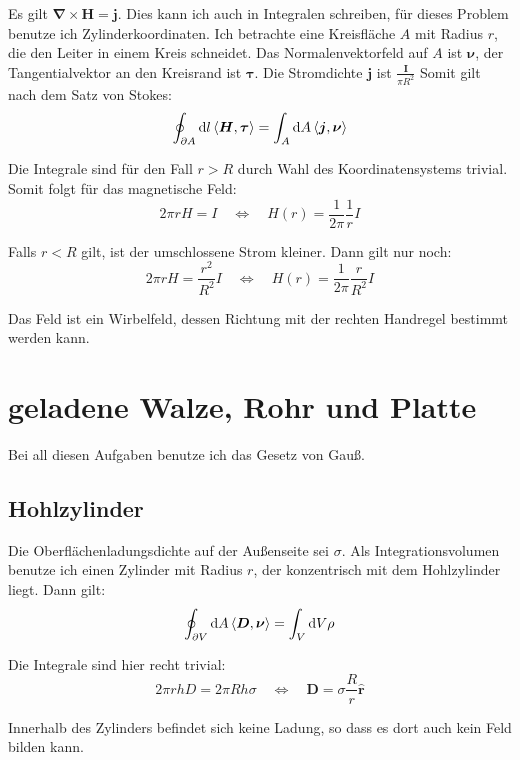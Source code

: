 \documentclass[11pt, ngerman]{article}
\newcommand{\inner}[2]{\left\langle #1, #2 \right\rangle}
\newcommand{\vnabla}{\vec \nabla}
\renewcommand{\vec}[1]{\boldsymbol{#1}}
\begin{document}
Es gilt $\vnabla \times \vec H = \vec j$. Dies kann ich auch in Integralen
schreiben, für dieses Problem benutze ich Zylinderkoordinaten. Ich betrachte
eine Kreisfläche $A$ mit Radius $r$, die den Leiter in einem Kreis schneidet.
Das Normalenvektorfeld auf $A$ ist $\vec \nu$, der Tangentialvektor an den
Kreisrand ist $\vec \tau$. Die Stromdichte $\vec j$ ist $\frac{\vec I}{\pi R^2}$ Somit gilt nach dem Satz von Stokes:
%
\[
	\oint_{\partial A} \dif l \inner{\vec H}{\vec \tau} = \int_A \dif A \inner{\vec j}{\vec \nu}
\]

Die Integrale sind für den Fall $r > R$ durch Wahl des Koordinatensystems trivial. Somit folgt für das magnetische Feld:
\[
	2 \pi r H = I
	\quad \Leftrightarrow \quad
	H(r) = \frac{1}{2\pi} \frac{1}r I
\]

Falls $r < R$ gilt, ist der umschlossene Strom kleiner. Dann gilt nur noch:
\[
	2 \pi r H = \frac{r^2}{R^2} I
	\quad \Leftrightarrow \quad
	H(r) = \frac{1}{2\pi} \frac{r}{R^2} I
\]

Das Feld ist ein Wirbelfeld, dessen Richtung mit der rechten Handregel bestimmt
werden kann.


\section{geladene Walze, Rohr und Platte}

Bei all diesen Aufgaben benutze ich das Gesetz von Gauß.

\subsection{Hohlzylinder}

Die Oberflächenladungsdichte auf der Außenseite sei $\sigma$. Als
Integrationsvolumen benutze ich einen Zylinder mit Radius $r$, der konzentrisch mit dem
Hohlzylinder liegt. Dann gilt:
\[
	\oint_{\partial V} \dif A \inner{\vec D}{\vec \nu} = \int_V \dif V \rho
\]

Die Integrale sind hier recht trivial:
\[
	2 \pi r h D = 2 \pi R h \sigma
	\quad \Leftrightarrow \quad
	\vec D = \sigma \frac{R}{r} \hat{\vec r}
\]

Innerhalb des Zylinders befindet sich keine Ladung, so dass es dort auch kein Feld bilden kann.
\end{document}
